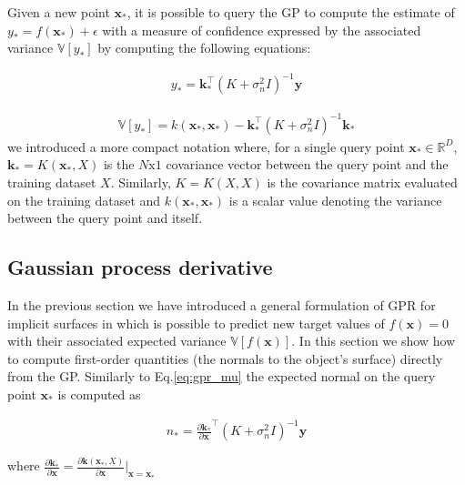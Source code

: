 Given a new point $\mathbf{x}_*$, it is possible to query the GP to compute the estimate of $y_*=f(\mathbf{x}_*)+\epsilon$ with a measure of confidence expressed by the associated variance $\mathbb{V}[y_*]$ by computing the following equations:

\begin{eqnarray}
\label{eq:gpr_mu}
y_*=\mathbf{k}_*^\top(K+\sigma_n^2I)^{-1}\mathbf{y}
\end{eqnarray}

\begin{eqnarray}
\label{eq:gpr_var}
\mathbb{V}[y_*]=k(\mathbf{x}_*,\mathbf{x}_*)-\mathbf{k}_*^\top(K+\sigma_n^2I)^{-1}\mathbf{k}_*
\end{eqnarray}
we introduced a more compact notation where, for a single query point $\mathbf{x}_*\in\mathbb{R}^D$, $\mathbf{k}_*=K(\mathbf{x}_*,X)$ is the $N\text{x}1$ covariance vector between the query point and the training dataset $X$. Similarly, $K=K(X,X)$ is the covariance matrix evaluated on the training dataset and $k(\mathbf{x}_*,\mathbf{x}_*)$ is a scalar value denoting the variance between the query point and itself.

\subsection{Gaussian process derivative}

In the previous section we have introduced a general formulation of GPR for implicit surfaces in which is possible to predict new target values of $f(\mathbf{x})=0$ with their associated expected variance $\mathbb{V}[f(\mathbf{x})]$. In this section we show how to compute first-order quantities (the normals to the object's surface) directly from the GP.  Similarly to Eq.\ref{eq:gpr_mu} the expected normal on the query point $\mathbf{x}_*$ is computed as

\begin{eqnarray}
\label{eq:gpr_n}
n_*=\frac{\partial\mathbf{k}_*}{\partial\mathbf{x}}^\top(K+\sigma_n^2I)^{-1}\mathbf{y}
\end{eqnarray}

where $\frac{\partial\mathbf{k}_*}{\partial\mathbf{x}}=\frac{\partial\mathbf{k}(\mathbf{x}_*,X)}{\partial\mathbf{x}}\vert_{\mathbf{x}=\mathbf{x}_*}$

